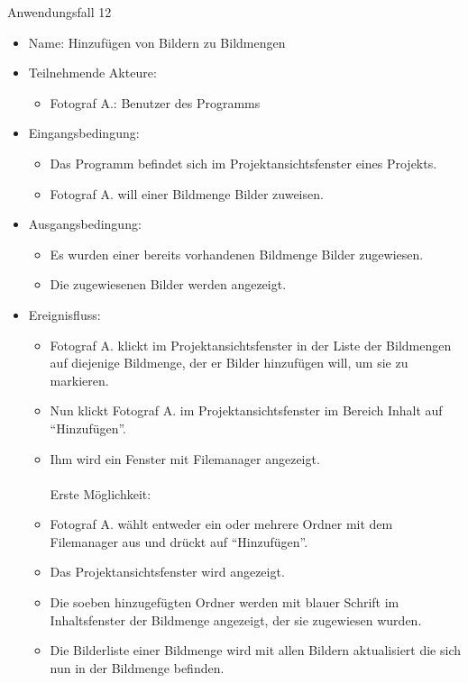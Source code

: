 	\begin{description}
		\item[Anwendungsfall 12]
	\end{description}
	
	\begin{itemize}
		\item Name: Hinzufügen von Bildern zu Bildmengen
		\item Teilnehmende Akteure:
		\begin{itemize}
			\item	Fotograf A.: Benutzer des Programms		
		\end{itemize}
		\item Eingangsbedingung:
		\begin{itemize}
			\item	Das Programm befindet sich im Projektansichtsfenster eines Projekts.
			\item Fotograf A. will einer Bildmenge Bilder zuweisen.
		\end{itemize}
		\item Ausgangsbedingung:
		\begin{itemize}
			\item	Es wurden einer bereits vorhandenen Bildmenge Bilder zugewiesen.
			\item Die zugewiesenen Bilder werden angezeigt.
		\end{itemize}
		\item Ereignisfluss:
		\begin{itemize}
			\item Fotograf A. klickt im Projektansichtsfenster in der Liste der Bildmengen auf diejenige Bildmenge, der er Bilder hinzufügen will, um sie zu markieren.		
			\item Nun klickt Fotograf A. im Projektansichtsfenster im Bereich Inhalt auf "`Hinzufügen"'.
			\item Ihm wird ein Fenster mit Filemanager angezeigt.\\\\Erste Möglichkeit:\\
			\item Fotograf A. wählt entweder ein oder mehrere Ordner mit dem Filemanager aus und drückt auf "`Hinzufügen"'.
			\item Das Projektansichtsfenster wird angezeigt.
			\item Die soeben hinzugefügten Ordner werden mit blauer Schrift im Inhaltsfenster der Bildmenge angezeigt, der sie zugewiesen wurden.
			\item Die Bilderliste einer Bildmenge wird mit allen Bildern aktualisiert die sich nun in der Bildmenge befinden.

\end{itemize}
\end{itemize}
